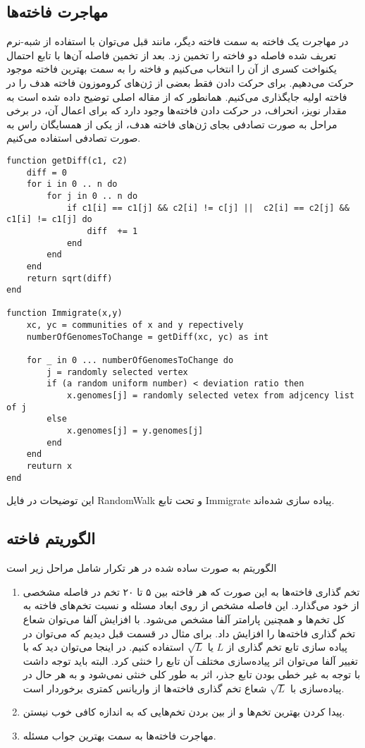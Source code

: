 \documentclass{article}
\begin{document}
\subsection*{مهاجرت فاخته‌ها}
در مهاجرت یک فاخته به سمت فاخته دیگر، مانند قبل می‌توان با استفاده از شبه-نرم تعریف شده فاصله دو فاخته را تخمین زد. بعد از تخمین فاصله آن‌ها با تابع احتمال یکنواخت کسری از آن را انتخاب می‌کنیم و فاخته را به سمت بهترین فاخته موجود حرکت می‌دهیم. برای حرکت دادن فقط بعضی از ژن‌های کروموزون‌ فاخته هدف را در فاخته اولیه جایگذاری می‌کنیم. همانطور که از مقاله اصلی توضیح داده شده است به مقدار نویز، انحراف، در حرکت دادن فاخته‌ها وجود دارد که برای اعمال آن، در برخی مراحل به صورت تصادفی بجای ژن‌های فاخته هدف، از یکی از همسایگان راس به صورت تصادفی استفاده می‌کنیم.
\begin{latin}
\begin{lstlisting}[style=lua]
function getDiff(c1, c2)
	diff = 0
	for i in 0 .. n do
		for j in 0 .. n do
			if c1[i] == c1[j] && c2[i] != c[j] ||  c2[i] == c2[j] && c1[i] != c1[j] do
				diff  += 1
			end
		end
	end
	return sqrt(diff)
end

function Immigrate(x,y)
	xc, yc = communities of x and y repectively
	numberOfGenomesToChange = getDiff(xc, yc) as int
	
	for _ in 0 ... numberOfGenomesToChange do
		j = randomly selected vertex
		if (a random uniform number) < deviation ratio then
			x.genomes[j] = randomly selected vetex from adjcency list of j
		else 
			x.genomes[j] = y.genomes[j]
		end
	end
	reuturn x	
end
\end{lstlisting}
\end{latin}
این توضیحات در فایل RandomWalk و تحت تابع Immigrate پیاده سازی شده‌اند.

\subsection*{الگوریتم فاخته}
الگوریتم به صورت ساده شده در هر تکرار شامل مراحل زیر است
\begin{enumerate}
\item
تخم گذاری فاخته‌ها به این صورت که هر فاخته بین ۵ تا ۲۰ تخم در فاصله‌ مشخصی از خود می‌گذارد. این فاصله مشخص از روی ابعاد مسئله و نسبت‌ تخم‌های فاخته به کل تخم‌ها و همچنین پارامتر آلفا مشخص می‌شود. با افزایش‌ آلفا می‌توان شعاع تخم گذاری فاخته‌ها را افزایش داد. برای مثال در قسمت قبل دیدیم که می‌توان در پیاده سازی تابع تخم گذاری از $L$ یا $\sqrt{L}$ استفاده کنیم. در اینجا می‌توان دید که با تغییر آلفا می‌توان اثر پیاده‌سازی مختلف آن تابع را خنثی کرد. البته باید توجه داشت با توجه به غیر خطی بودن تابع جذر، اثر به طور کلی خنثی نمی‌شود و به هر حال در پیاده‌سازی با $\sqrt{L}$ شعاع تخم گذاری فاخته‌ها از واریانس کمتری برخوردار است.

\item
پیدا کردن بهترین تخم‌ها و از بین بردن تخم‌هایی که به اندازه کافی خوب نیستن.

\item
مهاجرت فاخته‌ها به سمت بهترین جواب مسئله.
\end{enumerate}
\end{document}
